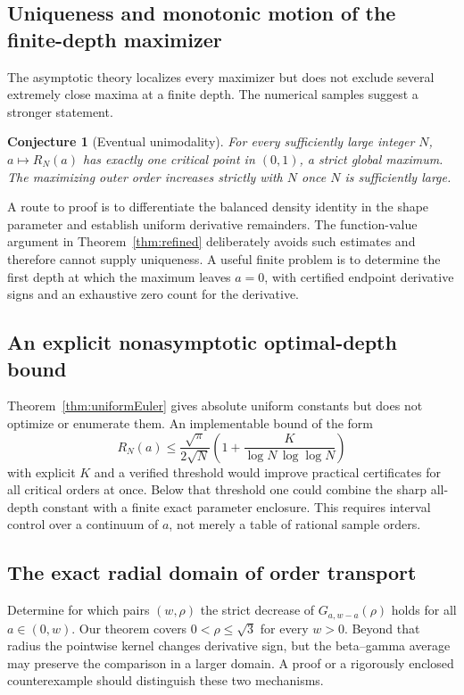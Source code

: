\documentclass[11pt]{article}
\numberwithin{equation}{section}
\newtheorem{conjecture}[theorem]{Conjecture}
\theoremstyle{definition}\newtheorem{definition}[theorem]{Definition}
\theoremstyle{remark}\newtheorem{remark}[theorem]{Remark}
\begin{document}
\subsection{Uniqueness and monotonic motion of the finite-depth maximizer}
The asymptotic theory localizes every maximizer but does not exclude
several extremely close maxima at a finite depth. The numerical samples
suggest a stronger statement.
\begin{conjecture}[Eventual unimodality]\label{conj:unimodal}
For every sufficiently large integer $N$, $a\mapsto R_N(a)$ has exactly
one critical point in $(0,1)$, a strict global maximum. The maximizing
outer order increases strictly with $N$ once $N$ is sufficiently large.
\end{conjecture}
A route to proof is to differentiate the balanced density identity in
the shape parameter and establish uniform derivative remainders. The
function-value argument in Theorem~\ref{thm:refined} deliberately avoids
such estimates and therefore cannot supply uniqueness. A useful finite
problem is to determine the first depth at which the maximum leaves
$a=0$, with certified endpoint derivative signs and an exhaustive
zero count for the derivative.

\subsection{An explicit nonasymptotic optimal-depth bound}
Theorem~\ref{thm:uniformEuler} gives absolute uniform constants but does
not optimize or enumerate them. An implementable bound of the form
\[
 R_N(a)\le\frac{\sqrt\pi}{2\sqrt N}
 \left(1+\frac{K}{\log N\,\log\log N}\right)
\]
with explicit $K$ and a verified threshold would improve practical
certificates for all critical orders at once. Below that threshold one
could combine the sharp all-depth constant with a finite exact
parameter enclosure. This requires interval control over a continuum
of $a$, not merely a table of rational sample orders.

\subsection{The exact radial domain of order transport}
Determine for which pairs $(w,\rho)$ the strict decrease of
$G_{a,w-a}(\rho)$ holds for all $a\in(0,w)$. Our theorem covers
$0<\rho\le\sqrt3$ for every $w>0$. Beyond that radius the pointwise
kernel changes derivative sign, but the beta--gamma average may preserve
the comparison in a larger domain. A proof or a rigorously enclosed
counterexample should distinguish these two mechanisms.
\end{document}
